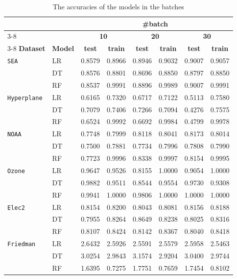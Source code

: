 \begin{table}[H]
    \centering
    \small
    \caption{The accuracies of the models in the batches}
    \label{tab:acc_batch}
    \begin{tabular}{llcccccc}\toprule
    & & \multicolumn{6}{c}{\textbf{\#batch}}\\
    \cmidrule(lr){3-8}
    & & \multicolumn{2}{c}{\textbf{10}} & \multicolumn{2}{c}{\textbf{20}} & \multicolumn{2}{c}{\textbf{30}} \\
    \cmidrule(lr){3-8}
    \textbf{Dataset} & \textbf{Model} & \textbf{test} & \textbf{train} & \textbf{test} & \textbf{train} & \textbf{test} & \textbf{train} \\
    \midrule
    \texttt{SEA} & LR & 0.8579 & 0.8966 & 0.8946 & 0.9032 & 0.9007 & 0.9057 \\
                          & DT & 0.8576 & 0.8801 & 0.8696 & 0.8850 & 0.8797 & 0.8850 \\
                          & RF & 0.8537 & 0.9991 & 0.8896 & 0.9989 & 0.9007 & 0.9991 \\
    \midrule
    \texttt{Hyperplane} & LR & 0.6165 & 0.7320 & 0.6717 & 0.7122 & 0.5113 & 0.7580 \\
                          & DT & 0.7079 & 0.7406 & 0.7266 & 0.7094 & 0.4276 & 0.7575 \\
                          & RF & 0.6524 & 0.9992 & 0.6692 & 0.9984 & 0.4799 & 0.9978 \\
    \midrule
    \texttt{NOAA} & LR & 0.7748 & 0.7999 & 0.8118 & 0.8041 & 0.8173 & 0.8014 \\
                          & DT & 0.7500 & 0.7881 & 0.7734 & 0.7996 & 0.7808 & 0.7990 \\
                          & RF & 0.7723 & 0.9996 & 0.8338 & 0.9997 & 0.8154 & 0.9995 \\
    \midrule
    \texttt{Ozone} & LR & 0.9647 & 0.9526 & 0.8155 & 1.0000 & 0.9054 & 1.0000 \\
                          & DT & 0.9882 & 0.9511 & 0.8544 & 0.9554 & 0.9730 & 0.9308 \\
                          & RF & 0.9941 & 1.0000 & 0.9806 & 1.0000 & 1.0000 & 1.0000 \\
    \midrule
    \texttt{Elec2} & LR & 0.8154 & 0.8200 & 0.8043 & 0.8081 & 0.8156 & 0.8188 \\
                          & DT & 0.7955 & 0.8264 & 0.8649 & 0.8238 & 0.8025 & 0.8316 \\
                          & RF & 0.8107 & 0.8424 & 0.8142 & 0.8367 & 0.8040 & 0.8418 \\
    \midrule
    \texttt{Friedman} & LR & 2.6432 & 2.5926 & 2.5591 & 2.5579 & 2.5958 & 2.5463 \\
                          & DT & 3.0254 & 2.9843 & 3.1574 & 2.9204 & 3.0400 & 2.9744 \\
                          & RF & 1.6395 & 0.7275 & 1.7751 & 0.7659 & 1.7454 & 0.8102 \\
    \midrule
    \end{tabular}
\end{table}

